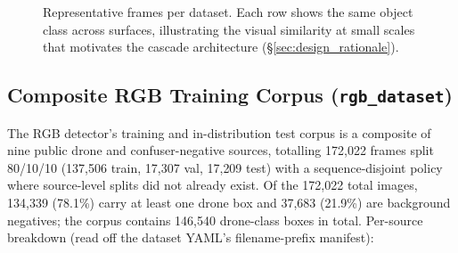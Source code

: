 \documentclass[12pt,a4paper,oneside,openright]{book}
\begin{document}
\begin{figure}[htbp]
    \centering
    \caption{Representative frames per dataset. Each row shows the same object class across surfaces, illustrating the visual similarity at small scales that motivates the cascade architecture (\S\ref{sec:design_rationale}).}
    \label{fig:dataset_montage}
\end{figure}

\subsection{Composite RGB Training Corpus (\texttt{rgb\_dataset})}
\label{sec:ds_rgb_corpus}

The RGB detector's training and in-distribution test corpus is a composite of nine public drone and confuser-negative sources, totalling 172{,}022 frames split 80/10/10 (137{,}506 train, 17{,}307 val, 17{,}209 test) with a sequence-disjoint policy where source-level splits did not already exist. Of the 172{,}022 total images, 134{,}339 (78.1\%) carry at least one drone box and 37{,}683 (21.9\%) are background negatives; the corpus contains 146{,}540 drone-class boxes in total. Per-source breakdown (read off the dataset YAML's filename-prefix manifest):
\end{document}
